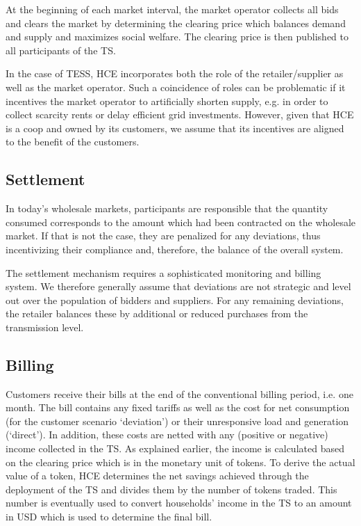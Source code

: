At the beginning of each market interval, the market operator collects all bids and clears the market by determining the clearing price which balances demand and supply and maximizes social welfare. The clearing price is then published to all participants of the TS.

In the case of TESS, HCE incorporates both the role of the retailer/supplier as well as the market operator. Such a coincidence of roles can be problematic if it incentives the market operator to artificially shorten supply, e.g. in order to collect scarcity rents or delay efficient grid investments. However, given that HCE is a coop and owned by its customers, we assume that its incentives are aligned to the benefit of the customers.

\subsection{Settlement}

In today's wholesale markets, participants are responsible that the quantity consumed corresponds to the amount which had been contracted on the wholesale market. If that is not the case, they are penalized for any deviations, thus incentivizing their compliance and, therefore, the balance of the overall system. 

The settlement mechanism requires a sophisticated monitoring and billing system. We therefore generally assume that deviations are not strategic and level out over the population of bidders and suppliers. For any remaining deviations, the retailer balances these by additional or reduced purchases from the transmission level. 

\subsection{Billing}

Customers receive their bills at the end of the conventional billing period, i.e. one month. The bill contains any fixed tariffs as well as the cost for net consumption (for the customer scenario `deviation') or their unresponsive load and generation (`direct'). In addition, these costs are netted with any (positive or negative) income collected in the TS. As explained earlier, the income is calculated based on the clearing price which is in the monetary unit of tokens. To derive the actual value of a token, HCE determines the net savings achieved through the deployment of the TS and divides them by the number of tokens traded.
This number is eventually used to convert households' income in the TS to an amount in USD which is used to determine the final bill.

